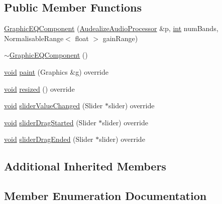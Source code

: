 \subsection*{Public Member Functions}
\begin{DoxyCompactItemize}
\item 
\hyperlink{class_audealize_1_1_graphic_e_q_component_ab690c00e0781736ace023674f37b3c54}{Graphic\+E\+Q\+Component} (\hyperlink{class_audealize_1_1_audealize_audio_processor}{Audealize\+Audio\+Processor} \&p, \hyperlink{tk_8h_a83f82f76e7fed06f4c49d2db94028a6d}{int} num\+Bands, Normalisable\+Range$<$ float $>$ gain\+Range)
\item 
\hyperlink{class_audealize_1_1_graphic_e_q_component_ad7f4ce7f4997722a486d67c3004d06ff}{$\sim$\+Graphic\+E\+Q\+Component} ()
\item 
\hyperlink{tk_8h_aba408b7cd755a96426e004c015f5de8e}{void} \hyperlink{class_audealize_1_1_graphic_e_q_component_aeaf0f48b8d94f1cdf56054f86f3b8ce9}{paint} (Graphics \&g) override
\item 
\hyperlink{tk_8h_aba408b7cd755a96426e004c015f5de8e}{void} \hyperlink{class_audealize_1_1_graphic_e_q_component_ab0348fd0be5be5c8eddeef17af65cd9a}{resized} () override
\item 
\hyperlink{tk_8h_aba408b7cd755a96426e004c015f5de8e}{void} \hyperlink{class_audealize_1_1_graphic_e_q_component_a8ba560fc23f1bb04d4f1ac8fe76bb49d}{slider\+Value\+Changed} (Slider $\ast$slider) override
\item 
\hyperlink{tk_8h_aba408b7cd755a96426e004c015f5de8e}{void} \hyperlink{class_audealize_1_1_graphic_e_q_component_a70d9867ba976483e0890c84ae6dd9d22}{slider\+Drag\+Started} (Slider $\ast$slider) override
\item 
\hyperlink{tk_8h_aba408b7cd755a96426e004c015f5de8e}{void} \hyperlink{class_audealize_1_1_graphic_e_q_component_a8ee6528363295d20b538bfa57f9d09e4}{slider\+Drag\+Ended} (Slider $\ast$slider) override
\end{DoxyCompactItemize}
\subsection*{Additional Inherited Members}


\subsection{Member Enumeration Documentation}
